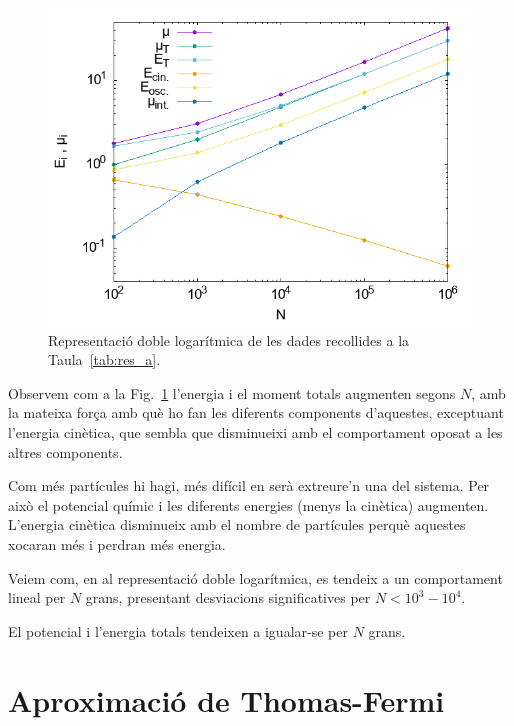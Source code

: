 \documentclass[a4paper]{article}
\begin{document}
\begin{figure}[H]
    \centering
    \includegraphics[width=0.7\linewidth]{../a.png}
\caption{Representació doble logarítmica de les dades recollides a la Taula~\ref{tab:res_a}.}
\label{fig:res_a}
\end{figure}

Observem com a la Fig.~\ref{fig:res_a} l'energia i el moment totals augmenten segons $N$, amb la mateixa força amb què ho fan les diferents components d'aquestes, exceptuant l'energia cinètica, que sembla que disminueixi amb el comportament oposat a les altres components.

Com més partícules hi hagi, més difícil en serà extreure'n una del sistema. Per això el potencial químic i les diferents energies (menys la cinètica) augmenten. L'energia cinètica disminueix amb el nombre de partícules perquè aquestes xocaran més i perdran més energia.

Veiem com, en al representació doble logarítmica, es tendeix a un comportament lineal per $N$ grans, presentant desviacions significatives per $N < 10^3-10^4$.

El potencial i l'energia totals tendeixen a igualar-se per $N$ grans.




\section{\bf Aproximació de Thomas-Fermi}
\end{document}
